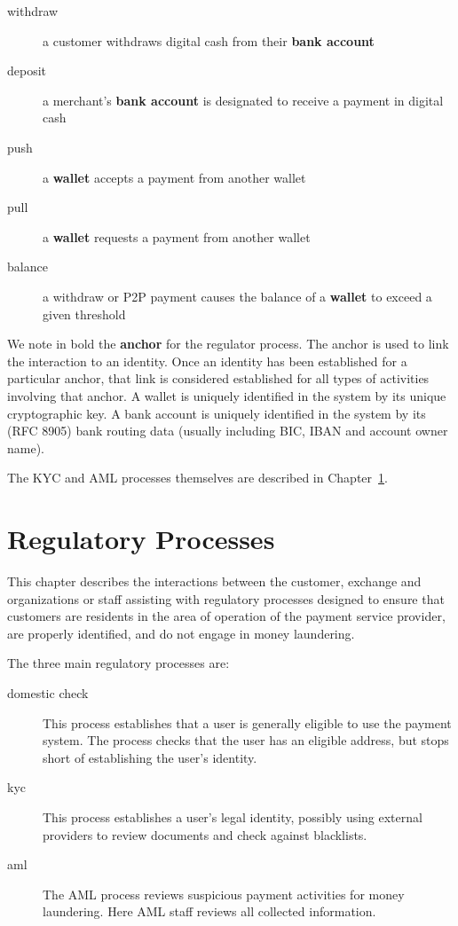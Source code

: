 \documentclass[10pt,a4paper,oneside]{book}
\begin{document}
\begin{description}
  \item[withdraw] a customer withdraws digital cash from their {\bf bank account}
  \item[deposit] a merchant's {\bf bank account} is designated to receive a payment in digital cash
  \item[push] a {\bf wallet} accepts a payment from another wallet
  \item[pull] a {\bf wallet} requests a payment from another wallet
  \item[balance] a withdraw or P2P payment causes the balance of a {\bf wallet} to exceed a given threshold
\end{description}

We note in bold the {\bf anchor} for the regulator process. The anchor is used
to link the interaction to an identity.  Once an identity has been established
for a particular anchor, that link is considered established for all types of
activities involving that anchor.  A wallet is uniquely identified in the
system by its unique cryptographic key.  A bank account is uniquely identified
in the system by its (RFC 8905) bank routing data (usually including BIC, IBAN
and account owner name).

The KYC and AML processes themselves are described in
Chapter~\ref{chap:regproc}.







\chapter{Regulatory Processes} \label{chap:regproc}

This chapter describes the interactions between the customer, exchange and
organizations or staff assisting with regulatory processes designed to ensure
that customers are residents in the area of operation of the payment service
provider, are properly identified, and do not engage in money laundering.

The three main regulatory processes are:

\begin{description}
\item[domestic check] This process establishes that a user is generally
  eligible to use the payment system.  The process checks that the user has an
  eligible address, but stops short of establishing the user's identity.
\item[kyc] This process establishes a user's legal identity, possibly
  using external providers to review documents and check against blacklists.
\item[aml] The AML process reviews suspicious payment activities for
  money laundering. Here AML staff reviews all collected information.
\end{description}
\end{document}
